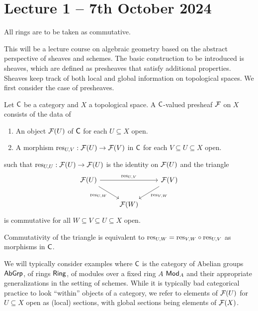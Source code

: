 \section{Lecture 1 -- 7th October 2024}\label{sec: lecture 1}
All rings are to be taken as commutative.

This will be a lecture course on algebraic geometry based on the abstract perspective of sheaves and schemes. The basic construction to be introduced is sheaves, which are defined as presheaves that satisfy additional properties. Sheaves keep track of both local and global information on topological spaces. We first consider the case of presheaves. 
\begin{definition}[Presheaf]\label{def: presheaf}
    Let $\mathsf{C}$ be a category and $X$ a topological space. A $\mathsf{C}$-valued presheaf $\mathcal{F}$ on $X$ consists of the data of 
    \begin{enumerate}[label=(\roman*)]
        \item An object $\mathcal{F}(U)$ of $\mathsf{C}$ for each $U\subseteq X$ open. 
        \item A morphism $\mathrm{res}_{U,V}:\mathcal{F}(U)\to\mathcal{F}(V)$ in $\mathsf{C}$ for each $V\subseteq U\subseteq X$ open. 
    \end{enumerate}
    such that $\mathrm{res}_{U,U}:\mathcal{F}(U)\to\mathcal{F}(U)$ is the identity on $\mathcal{F}(U)$ and the triangle 
    \begin{equation}\label{diag: presheaf triangle}
        \begin{tikzcd}
            {\Fcal(U)} && {\Fcal(V)} \\
            & {\Fcal(W)}
            \arrow["{\res_{U,V}}", from=1-1, to=1-3]
            \arrow["{\res_{U,W}}"', from=1-1, to=2-2]
            \arrow["{\res_{V,W}}", from=1-3, to=2-2]
        \end{tikzcd}
    \end{equation}
    is commutative for all $W\subseteq V\subseteq U\subseteq X$ open. 
\end{definition}
\begin{remark}
    Commutativity of the triangle is equivalent to $\mathrm{res}_{U,W}=\mathrm{res}_{V,W}\circ\mathrm{res}_{U,V}$ as morphisms in $\mathsf{C}$. 
\end{remark}
We will typically consider examples where $\mathsf{C}$ is the category of Abelian groups $\mathsf{AbGrp}$, of rings $\mathsf{Ring}$, of modules over a fixed ring $A$ $\mathsf{Mod}_{A}$ and their appropriate generalizations in the setting of schemes. While it is typically bad categorical practice to look ``within'' objects of a category, we refer to elements of $\mathcal{F}(U)$ for $U\subseteq X$ open as (local) sections, with global sections being elements of $\mathcal{F}(X)$. 
